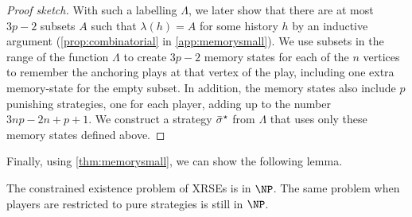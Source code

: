 \begin{proof}[Proof sketch]
With such a labelling $\Lambda$, we later show that there are at most $3p-2$ subsets $A$ such that $\lambda(h) = A$ for some history $h$ by an inductive argument (\cref{prop:combinatorial} in \cref{app:memorysmall}). 
We use subsets in the range of the function $\Lambda$  to create $3p-2$ memory states for each of the $n$ vertices to remember the anchoring plays at that vertex of the play, including one extra memory-state for the empty subset. In addition, the memory states also include $p$ punishing  strategies, one for each player, adding up to the number $3np-2n+p+1$. 
We construct a strategy ${\bar{\sigma}}^\star$ from $\Lambda$ that uses only these memory states defined above.
\end{proof}

Finally, using \cref{thm:memorysmall}, we can show the following lemma.

\begin{lemma}\label{lemma:np_easy}
    The constrained existence problem of XRSEs is in $\NP$. The same problem when players are restricted to pure strategies is still in $\NP$.
\end{lemma}

